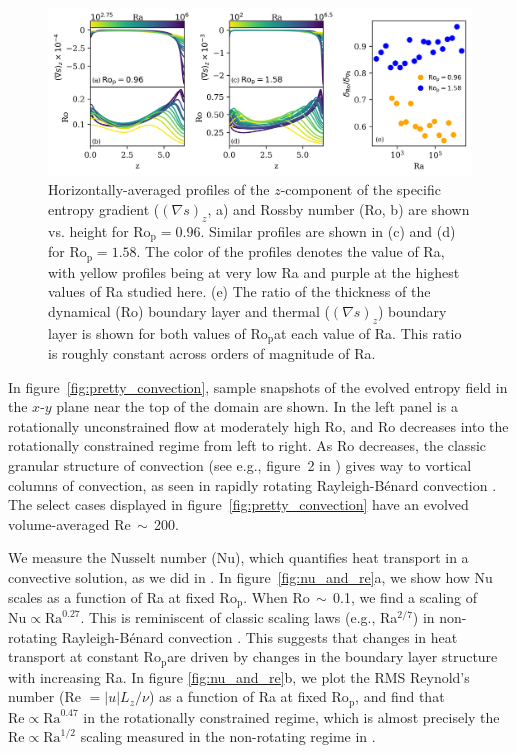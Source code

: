 \documentclass[twocolumn, amsmath, amsfonts, amssymb]{aastex62}
\newcommand{\grad}{\ensuremath{\nabla}}
\newcommand{\RB}{Rayleigh-B\'{e}nard }
\newcommand{\pro}{\ensuremath{\text{Ro}_{\text{p}}}}
\begin{document}
\begin{figure}[ht!]
    \includegraphics[width=\textwidth]{./figs/boundary_layers.png}
    \caption{Horizontally-averaged profiles of the $z$-component of 
    the specific entropy gradient ($(\grad s)_z$, a) and Rossby number (Ro, b) 
    are shown vs. height for $\pro = 0.96$. 
    Similar profiles are shown in (c) and (d) for $\pro = 1.58$. The color of the profiles
    denotes the value of Ra, with yellow profiles being at very low Ra and purple at the highest
    values of Ra studied here.
    (e) The ratio of the thickness of the dynamical (Ro) boundary layer and 
    thermal ($(\grad s)_z$) boundary layer is shown for both values of \pro at each value of Ra.
    This ratio is roughly constant across orders of magnitude of Ra.
    \label{fig:profiles_and_bls} }
\end{figure}

In figure~\ref{fig:pretty_convection}, sample snapshots
of the evolved entropy field in the $x$-$y$ plane near the top of the domain are shown. 
In the left panel is a rotationally unconstrained flow at moderately high
Ro, and Ro decreases into the rotationally constrained regime from left to right.
As Ro decreases, the
classic granular structure of convection (see e.g., figure~2 in \AB) gives way to vortical
columns of convection, as seen in rapidly rotating \RB convection \citep{stellmach&all2014}.
The select cases displayed in figure~\ref{fig:pretty_convection} have an evolved volume-averaged
Re$\,\sim\,$200.

We measure the Nusselt number (Nu), which quantifies heat transport in a convective
solution, as we did in \AB.
In figure~\ref{fig:nu_and_re}a, we show how Nu scales as a function
of Ra at fixed \pro. When Ro$\,\sim\,$0.1,
we find a scaling of $\text{Nu} \propto \text{Ra}^{0.27}$. This is reminiscent of
classic scaling laws (e.g., Ra$^{2/7}$) in non-rotating \RB convection \citep{ahlers&all2009}.
This suggests that changes in heat transport at constant \pro are driven by
changes in the boundary layer structure with increasing Ra.
In figure \ref{fig:nu_and_re}b, we plot the RMS Reynold's
number (Re $= |u| L_z / \nu$) as a function of Ra at fixed \pro, and find that 
$\text{Re} \propto \text{Ra}^{0.47}$ in the rotationally constrained regime,
which is almost precisely the $\text{Re} \propto \text{Ra}^{1/2}$ scaling measured
in the non-rotating regime in \AB.
\end{document}
